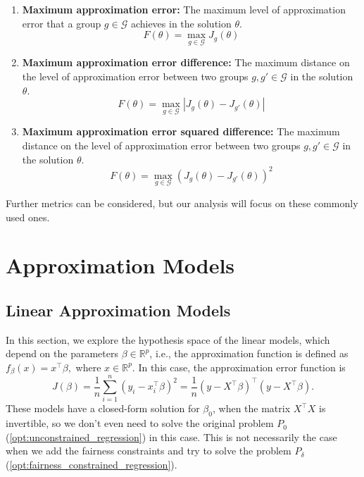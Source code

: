 \documentclass[11pt]{article}
\theoremstyle{plain}
\theoremstyle{definition}
\newcommand{\R}{\mathbb{R}}
\newcommand{\1}{\mathbf{1}}
\newcommand{\G}{\mathcal{G}}
\renewcommand{\R}{\mathbb{R}}
\begin{document}
\begin{enumerate}
    \item \textbf{Maximum approximation error:} The maximum level of approximation error that a group $g \in \G$ achieves in the solution $\theta$. 
    \begin{equation}
    \label{eq:max_error_fairness}
        F(\theta)=\max_{g\in \G} J_g(\theta)
    \end{equation}
    \item \textbf{Maximum approximation error difference:} The maximum distance on the level of approximation error between two groups $g,g' \in \G$ in the solution $\theta$. 
    \begin{equation}
        F(\theta)=\max_{g\in \G} |J_g(\theta) - J_{g'}(\theta)|
    \end{equation}
    \item \textbf{Maximum approximation error squared difference:} The maximum distance on the level of approximation error between two groups $g,g' \in \G$ in the solution $\theta$. 
    \begin{equation}
        F(\theta)=\max_{g\in \G} (J_g(\theta) - J_{g'}(\theta))^2
    \end{equation}
\end{enumerate}

Further metrics can be considered, but our analysis will focus on these commonly used ones.


\section{Approximation Models}

\subsection{Linear Approximation Models}

In this section, we explore the hypothesis space of the linear models, which depend on the parameters $\beta \in \R^p$, i.e., the approximation function is defined as $f_\beta(x)=x^{\top}\beta,$ where $x\in \R^p$. In this case, the approximation error function is $$J(\beta)=\frac{1}{n}\sum_{i=1}^n(y_i-x_i^{\top}\beta)^2 =\frac{1}{n}(y-X^{\top}\beta)^{\top}(y-X^{\top}\beta).$$  These models have a closed-form solution for $\beta_0$, when the matrix $X^{\top}X$ is invertible, so we don't even need to solve the original problem $P_0$ (\ref{opt:unconstrained_regression}) in this case.  This is not necessarily the case when we add the fairness constraints and try to solve the problem $P_\delta$ (\ref{opt:fairness_constrained_regression}). 
\end{document}
